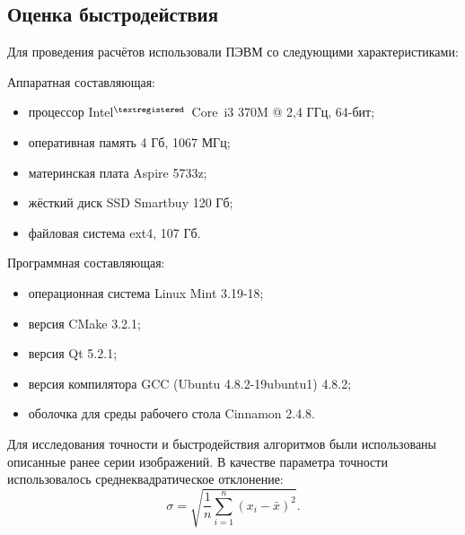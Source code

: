 \subsection {Оценка быстродействия}
Для проведения расчётов использовали ПЭВМ со следующими характеристиками:

Аппаратная составляющая:
\begin{itemize}
\item процессор Intel$^{\textregistered}$~Core\texttrademark~i3 370M @ 2,4 ГГц, 64-бит;
\item оперативная память 4 Гб, 1067 МГц;
\item материнская плата Aspire 5733z;
\item жёсткий диск SSD Smartbuy 120 Гб;
\item файловая система ext4, 107 Гб.
\end{itemize}

Программная составляющая:
\begin{itemize}
\item операционная система Linux Mint 3.19-18;
\item версия CMake 3.2.1;
\item версия Qt 5.2.1;
\item версия компилятора GCC (Ubuntu 4.8.2-19ubuntu1) 4.8.2;
\item оболочка для среды рабочего стола Cinnamon 2.4.8.
\end{itemize}

Для исследования точности и быстродействия алгоритмов были использованы описанные ранее серии изображений. В качестве параметра точности использовалось среднеквадратическое отклонение:
$$\sigma=\sqrt{\frac{1}{n}\sum_{i=1}^n\left(x_i-\bar{x}\right)^2}.$$
